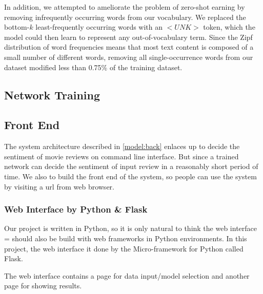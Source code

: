 \documentclass[conference]{IEEEtran}
\begin{document}
    In addition, we attempted to ameliorate the problem of zero-shot earning by removing 
    infrequently occurring words from our vocabulary. We replaced the bottom-$k$ 
    least-frequently occurring words with an $<UNK>$ token, which the model could then
    learn to represent any out-of-vocabulary term. Since the Zipf distribution of word frequencies
    means that most text content is composed of a small number of different words, removing all
    single-occurrence words from our dataset modified less than 0.75\% of the training dataset.

   
\subsection{Network Training}
   

\subsection{Front End}
\label{model:front}
    
    The system architecture described in \autoref{model:back} enlaces up to decide the
    sentiment of movie reviews on command line interface. But since a trained network can
    decide the sentiment of input review in a reasonably short period of time. We also
    to build the front end of the system, so people can use the system by visiting a
    url from web browser.
    
\subsubsection{Web Interface by Python \& Flask}
\label{model:front:web}
    Our project is written in Python, so it is only natural to think the web interface =
    should also be build with web frameworks in Python environments. 
    In this project, the web interface it done by the Micro-framework for 
    Python called Flask\cite{ronacher2010flask,grinberg2018flask}.
    
    The web interface contains a page for data input/model selection and another page for
    showing results.
    
\end{document}
